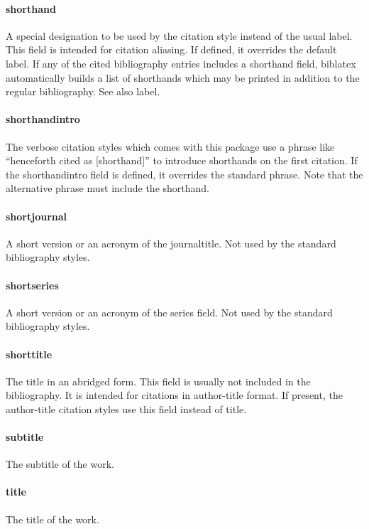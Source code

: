 \documentclass[a4paper,12pt]{report}
\begin{document}
\paragraph{shorthand}
A special designation to be used by the citation style instead of the usual label. This field is
intended for citation aliasing. If defined, it overrides the default label. If any of the cited
bibliography entries includes a shorthand field, biblatex automatically builds a list of
shorthands which may be printed in addition to the regular bibliography. See also label.

\paragraph{shorthandintro}
The verbose citation styles which comes with this package use a phrase like “henceforth
cited as [shorthand]” to introduce shorthands on the first citation. If the shorthandintro
field is defined, it overrides the standard phrase. Note that the alternative phrase must
include the shorthand.

\paragraph{shortjournal}
A short version or an acronym of the journaltitle. Not used by the standard bibliography
styles.

\paragraph{shortseries}
A short version or an acronym of the series field. Not used by the standard bibliography
styles.

\paragraph{shorttitle}
The title in an abridged form. This field is usually not included in the bibliography. It is
intended for citations in author-title format. If present, the author-title citation styles use
this field instead of title.

\paragraph{subtitle}
The subtitle of the work.

\paragraph{title}
The title of the work.
\end{document}
